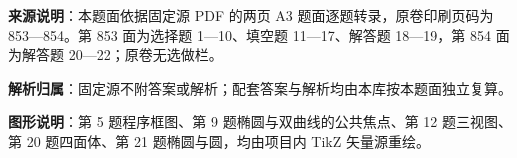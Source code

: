 

\begin{gknotice}
\textbf{来源说明}：本题面依据固定源 PDF 的两页 A3 题面逐题转录，原卷印刷页码为 853—854。第 853 面为选择题 1—10、填空题 11—17、解答题 18—19，第 854 面为解答题 20—22；原卷无选做栏。

\textbf{解析归属}：固定源不附答案或解析；配套答案与解析均由本库按本题面独立复算。

\textbf{图形说明}：第 5 题程序框图、第 9 题椭圆与双曲线的公共焦点、第 12 题三视图、第 20 题四面体、第 21 题椭圆与圆，均由项目内 TikZ 矢量源重绘。
\end{gknotice}


